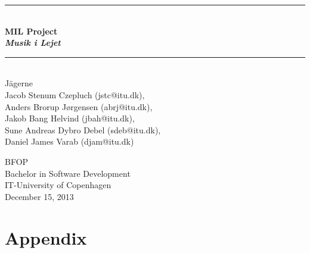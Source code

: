 \documentclass[a4paper,11pt]{article}
\begin{document}
\begin{titlepage}
\centering \parindent=0pt
\newcommand{\HRule}{\rule{\textwidth}{1mm}}
 \HRule\\[1cm]\Huge\bfseries
MIL Project\\\emph{Musik i Lejet}\\[0.7cm]
\HRule\\[4cm]  \large  Jägerne
\\Jacob Stenum Czepluch (jstc@itu.dk), \\
Anders Brorup Jørgensen (abrj@itu.dk), \\
Jakob Bang Helvind (jbah@itu.dk), \\
Sune Andreas Dybro Debel (sdeb@itu.dk), \\
Daniel James Varab (djam@itu.dk) \\

 \normalsize %
\thispagestyle{empty}
\begin{flushleft}
BFOP \\
Bachelor in Software Development\\


IT-University of Copenhagen\\
December 15, 2013 \end{flushleft}
\end{titlepage}
\tableofcontents
\pagebreak
\pagebreak
{}
\setcounter{page}{1}





\appendix
\part{Appendix}















%
\end{document}
